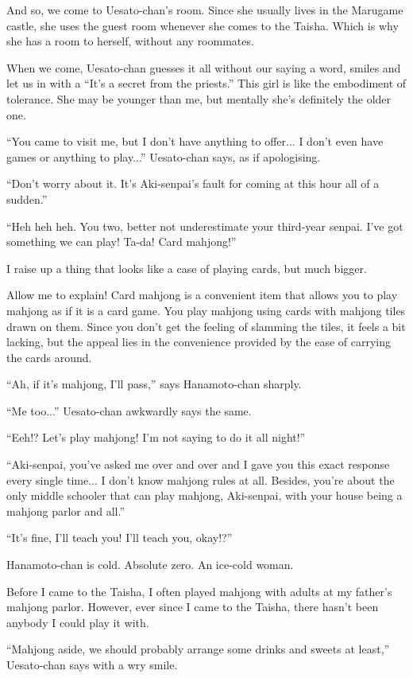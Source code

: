 And so, we come to Uesato-chan's room. Since she usually lives in the Marugame castle, she uses the guest room whenever she comes to the Taisha. Which is why she has a room to herself, without any roommates.

When we come, Uesato-chan guesses it all without our saying a word, smiles and let us in with a ``It's a secret from the priests.'' This girl is like the embodiment of tolerance. She may be younger than me, but mentally she's definitely the older one.

``You came to visit me, but I don't have anything to offer... I don't even have games or anything to play...'' Uesato-chan says, as if apologising.

``Don't worry about it. It's Aki-senpai's fault for coming at this hour all of a sudden.''

``Heh heh heh. You two, better not underestimate your third-year senpai. I've got something we can play! Ta-da! Card mahjong!''

I raise up a thing that looks like a case of playing cards, but much bigger.

Allow me to explain! Card mahjong is a convenient item that allows you to play mahjong as if it is a card game. You play mahjong using cards with mahjong tiles drawn on them. Since you don't get the feeling of slamming the tiles, it feels a bit lacking, but the appeal lies in the convenience provided by the ease of carrying the cards around.

``Ah, if it's mahjong, I'll pass,'' says Hanamoto-chan sharply.

``Me too...'' Uesato-chan awkwardly says the same.

``Eeh!? Let's play mahjong! I'm not saying to do it all night!''

``Aki-senpai, you've asked me over and over and I gave you this exact response every single time... I don't know mahjong rules at all. Besides, you're about the only middle schooler that can play mahjong, Aki-senpai, with your house being a mahjong parlor and all.''

``It's fine, I'll teach you! I'll teach you, okay!?''

Hanamoto-chan is cold. Absolute zero. An ice-cold woman.

Before I came to the Taisha, I often played mahjong with adults at my father's mahjong parlor. However, ever since I came to the Taisha, there hasn't been anybody I could play it with.

``Mahjong aside, we should probably arrange some drinks and sweets at least,'' Uesato-chan says with a wry smile.

